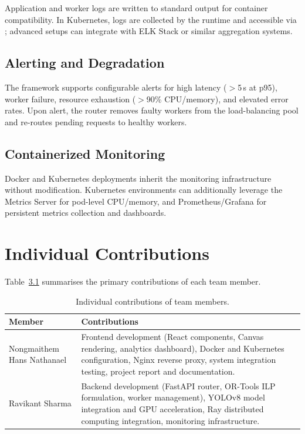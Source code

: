 \documentclass[12pt,a4paper]{report}
\newcommand{\code}[1]{\texttt{\detokenize{#1}}}
\begin{document}
Application and worker logs are written to standard output for container compatibility. In Kubernetes, logs are collected by the runtime and accessible via \code{kubectl logs}; advanced setups can integrate with ELK Stack or similar aggregation systems.

\section{Alerting and Degradation}
The framework supports configurable alerts for high latency ($>$5\,s at p95), worker failure, resource exhaustion ($>$90\% CPU/memory), and elevated error rates. Upon alert, the router removes faulty workers from the load-balancing pool and re-routes pending requests to healthy workers.

\section{Containerized Monitoring}
Docker and Kubernetes deployments inherit the monitoring infrastructure without modification. Kubernetes environments can additionally leverage the Metrics Server for pod-level CPU/memory, and Prometheus/Grafana for persistent metrics collection and dashboards.

\chapter{Individual Contributions}
Table~\ref{tab:contrib} summarises the primary contributions of each team member.

\begin{table}[H]
\centering
\small
\begin{tabularx}{\textwidth}{@{}l X@{}}
  \toprule
  \textbf{Member} & \textbf{Contributions}\\
  \midrule
  Nongmaithem Hans Nathanael & Frontend development (React components, Canvas rendering, analytics dashboard), Docker and Kubernetes configuration, Nginx reverse proxy, system integration testing, project report and documentation.\\
  \addlinespace
  Ravikant Sharma & Backend development (FastAPI router, OR-Tools ILP formulation, worker management), YOLOv8 model integration and GPU acceleration, Ray distributed computing integration, monitoring infrastructure.\\
  \bottomrule
\end{tabularx}
\caption{Individual contributions of team members.}
\label{tab:contrib}
\end{table}
\end{document}
